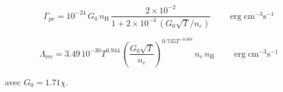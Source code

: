 \begin{equation}
    \Gamma_{\mathrm{pe}} = 10^{-24}\,G_0\,n_\mathrm{H}\, \frac{2\times 10^{-2}}{1 + 2\times 10^{-4}\,(G_0 \sqrt{T}/n_e)} \qquad \operatorname{erg} \mathrm{cm}^{-3} \mathrm{s}^{-1}
    \label{eq:Rollig:pe}
\end{equation}

\begin{equation}
    \Lambda_{\mathrm{rec}} = 3.49\,10^{-30} T^{0.944} \, (\frac{G_0 \sqrt{T}}{n_e})^{0.735 T^{-0.068}} \, n_e \, n_\mathrm{H} \qquad \operatorname{erg} \mathrm{cm}^{-3} \mathrm{s}^{-1}
    \label{eq:Rollig:rece}
\end{equation}

avec $G_0 = 1.71\chi$. \newline


